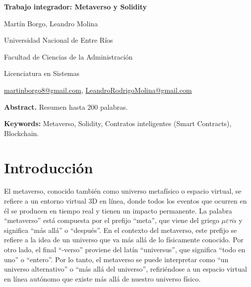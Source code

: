 \documentclass[a4paper,10pt]{article}
\begin{document}
	\pagestyle{empty}
	\begin{titlepage}
		\centering
		\vspace*{1.5cm}
		{\fontsize{14}{17}\bfseries Trabajo integrador: Metaverso y Solidity\par}
		{\small Martín Borgo, Leandro Molina\par}
		{\normalsize Universidad Nacional de Entre Ríos\par}
		{\normalsize Facultad de Ciencias de la Administración\par}
		{\normalsize Licenciatura en Sistemas \par}
		{\small \href{mailto:martinborgo8@gmail.com}{martinborgo8@gmail.com}, \href{mailto:LeandroRodrigoMolina@gmail.com}{LeandroRodrigoMolina@gmail.com}\par}
		
		{\small \textbf{Abstract.} Resumen hasta 200 palabras. \par}
		{\small \textbf{Keywords:} Metaverso, Solidity, Contratos inteligentes (Smart Contracts), Blockchain.\par}
	\end{titlepage}
	
	\section{Introducción}
	El metaverso, conocido también como universo metafísico o espacio virtual, se refiere a un entorno virtual 3D en línea, donde todos los eventos que ocurren en él se producen en tiempo real y tienen un impacto permanente. La palabra “metaverso” está compuesta por el prefijo “meta”, que viene del griego \( \mu\varepsilon\tau\acute{\alpha} \) y significa “más allá” o “después”. En el contexto del metaverso, este prefijo se refiere a la idea de un universo que va más allá de lo físicamente conocido. Por otro lado, el final “-verso” proviene del latín “universus”, que significa “todo en uno” o “entero”. Por lo tanto, el metaverso se puede interpretar como “un universo alternativo” o “más allá del universo”, refiriéndose a un espacio virtual en línea autónomo que existe más allá de nuestro universo físico.
	
\end{document}

